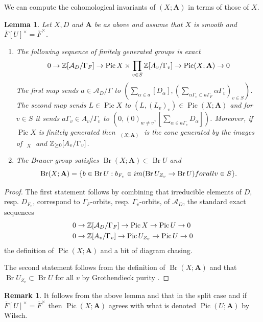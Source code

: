 \documentclass[a4paper,11pt,reqno]{amsart}
\DeclareMathOperator{\Pic}{Pic}
\DeclareMathOperator{\Eff}{\overline{Eff}}
\DeclareMathOperator{\Br}{Br}
\newtheorem{lemma}[theorem]{Lemma}
\theoremstyle{definition}
\newtheorem{remark}[theorem]{Remark}
\begin{document}
We can compute the cohomological invariants of $(X ; \mathbf{A})$ in terms of those of $X$.
\begin{lemma}\label{lem:Computation of Pic(X ; A)}
	Let $X, D$ and $\mathbf{A}$ be as above and assume that $X$ is smooth and $\overline{F}[U]^{\times} = \overline{F}^{\times}$.
	\begin{enumerate}
		\item The following sequence of finitely generated groups is exact
		\[
		0 \to \Z[\mathcal{A}_D /\Gamma_F] \to \Pic X \times \prod_{v \in S} \Z[A_v/\Gamma_v] \to \Pic (X ; \mathbf{A}) \to 0
		\]
		The first map sends $a \in \mathcal{A}_D/\Gamma$ to $(\sum_{\alpha \in a} [D_{\alpha}], (\sum_{\alpha\Gamma_v \subset a\Gamma_F} \alpha\Gamma_v)_{v \in S})$. The second map sends 
		$L \in \Pic X$ to $(L, (L_v)_v) \in \Pic (X ; \mathbf{A})$ and for $v \in S$ it sends $a\Gamma_v \in A_v /\Gamma_v$ to $(0, (0)_{w \neq v}, [\sum_{\alpha \in a \Gamma_v} D_{\alpha}])$. 
		Moreover, if $\Pic X$ is finitely generated then $\Eff_{(X ; \mathbf{A})}$ is the cone generated by the images of $\Eff_X$ and $\mathbb{Z}_{\geq 0}[A_v / \Gamma_v]$.
		\item The Brauer group satisfies $\Br (X ; \mathbf{A}) \subset \Br U$ and 
		\[
		\Br (X ; \mathbf{A}) = \{b \in \Br U: b_{F_v} \in \emph{im}(\Br U_{Z_v} \to \Br U) \emph{ for all } v \in S\}.
		\]
	\end{enumerate}
\end{lemma}
\begin{proof}
	The first statement follows by combining that irreducible elements of $D$, resp. $D_{F_v}$, correspond to $\Gamma_F$-orbits, resp. $\Gamma_v$-orbits, of $\mathcal{A}_D$, the standard exact sequences
	\begin{align*}
		&0 \to \Z[\mathcal{A}_D/ \Gamma_F] \to \Pic X \to \Pic U \to 0 \\
		&0 \to \Z[A_v/\Gamma_v] \to \Pic U_{Z_v} \to \Pic U \to 0
	\end{align*}
	the definition of $\Pic (X ; \mathbf{A})$ and a bit of diagram chasing.
	
	The second statement follows from the definition of $\Br (X ; \mathbf{A})$ and that $\Br U_{Z_v} \subset \Br U$ for all $v$ by Grothendieck purity \cite[Thm.~3.7.1]{Colliot2021Brauer}.
\end{proof}
\begin{remark}
	It follows from the above lemma and \cite[Lem.~2.2.3]{Wilsch2022Integral} that in the split case and if $\overline{F}[U]^{\times} = \overline{F}^{\times}$ then $\Pic(X ; \mathbf{A})$ agrees with what is denoted $\Pic(U; \mathbf{A})$ by Wilsch.
\end{remark}
\end{document}
